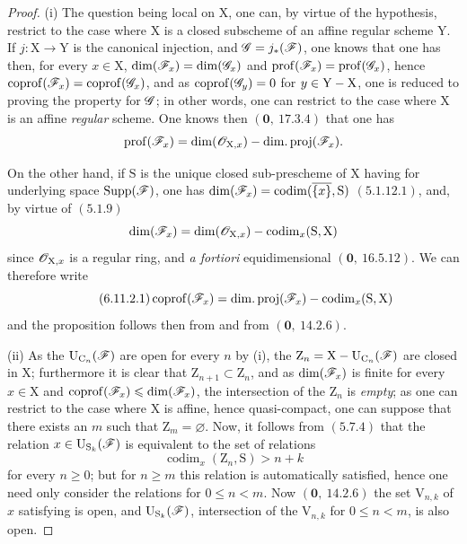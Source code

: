 \begin{proof}
(i) The question being local on $\mathrm{X}$, one can, by virtue of the hypothesis, restrict to the
case where $\mathrm{X}$ is a closed subscheme of an affine regular scheme $\mathrm{Y}$. If $j:\mathrm{X}\to\mathrm{Y}$ is
the canonical injection, and $\mathscr{G}=j_*(\mathscr{F})$, one knows that one has then, for every $x\in\mathrm{X}$,
$\dim(\mathscr{F}_x)=\dim(\mathscr{G}_x)$ and $\operatorname{prof}(\mathscr{F}_x)=\operatorname{prof}(\mathscr{G}_x)$, hence $\operatorname{coprof}(\mathscr{F}_x)=\operatorname{coprof}(\mathscr{G}_x)$, and as
$\operatorname{coprof}(\mathscr{G}_y)=0$ for $y\in\mathrm{Y}-\mathrm{X}$, one is reduced to proving the property for $\mathscr{G}$;
in other words, one can restrict to the case where $\mathrm{X}$ is an affine \emph{regular} scheme. One knows then $(\mathbf{0},~17.3.4)$
that one has
\[
  \operatorname{prof}(\mathscr{F}_x)=\dim(\mathscr{O}_{\mathrm{X},x})-\operatorname{dim.proj}(\mathscr{F}_x).
\]

On the other hand, if $\mathrm{S}$ is the unique closed sub-prescheme of $\mathrm{X}$ having for underlying space
$\operatorname{Supp}(\mathscr{F})$, one has $\dim(\mathscr{F}_x)=\operatorname{codim}(\overline{\{x\}},\mathrm{S})$ $(5.1.12.1)$, and, by virtue of $(5.1.9)$
\[
  \dim(\mathscr{F}_x)=\dim(\mathscr{O}_{\mathrm{X},x})-\operatorname{codim}_x(\mathrm{S},\mathrm{X})
\]
since $\mathscr{O}_{\mathrm{X},x}$ is a regular ring, and \emph{a fortiori} equidimensional $(\mathbf{0},~16.5.12)$. We
can therefore write
\begin{equation}
\tag{6.11.2.1}
\label{IV.6.11.2.1}
  \operatorname{coprof}(\mathscr{F}_x)=\operatorname{dim.proj}(\mathscr{F}_x)-\operatorname{codim}_x(\mathrm{S},\mathrm{X})
\end{equation}
and the proposition follows then from  and from $(\mathbf{0},~14.2.6)$.


(ii) As the $\mathrm{U}_{\mathrm{C}_n}(\mathscr{F})$ are open for every $n$ by (i), the $\mathrm{Z}_n=\mathrm{X}-\mathrm{U}_{\mathrm{C}_n}(\mathscr{F})$
are closed in $\mathrm{X}$; furthermore it is clear that $\mathrm{Z}_{n+1}\subset\mathrm{Z}_n$, and as $\dim(\mathscr{F}_x)$ is finite
for every $x\in\mathrm{X}$ and $\operatorname{coprof}(\mathscr{F}_x)\leqslant\dim(\mathscr{F}_x)$, the intersection of the $\mathrm{Z}_n$ is \emph{empty}; as one can
restrict to the case where $\mathrm{X}$ is affine, hence quasi-compact, one can suppose that there exists an $m$
such that $\mathrm{Z}_m=\varnothing$. Now, it follows from $(5.7.4)$ that the relation $x\in\mathrm{U}_{\mathrm{S}_k}(\mathscr{F})$ is equivalent to the set of
relations
\begin{equation}
\tag{6.11.2.2}
\label{IV.6.11.2.2}
  \operatorname{codim}_x(\mathrm{Z}_n,\mathrm{S})>n+k
\end{equation}
for every $n\geqslant 0$; but for $n\geqslant m$ this relation is automatically satisfied, hence one
need only consider the relations  for $0\leqslant n<m$. Now $(\mathbf{0},~14.2.6)$
the set $\mathrm{V}_{n,k}$ of $x$ satisfying  is open, and $\mathrm{U}_{\mathrm{S}_k}(\mathscr{F})$, intersection of the $\mathrm{V}_{n,k}$
for $0\leqslant n<m$, is also open.


\end{proof}
